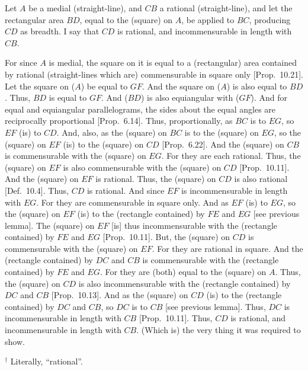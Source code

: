 \begin{Parallel}{}{}
{Let $A$ be a medial (straight-line), and $CB$ a rational (straight-line),
and let the rectangular area $BD$, equal to the (square) on $A$, 
 be applied to $BC$, producing $CD$ as breadth. I say that
$CD$ is rational, and incommensurable in  length with $CB$.

\epsfysize=2in
\centerline{}

For since $A$ is medial, the square on it is equal to a (rectangular) area
contained by rational (straight-lines which are) commensurable in square
only [Prop.~10.21]. Let the square on ($A$) be equal
to $GF$. And the square on ($A$) is also equal to $BD$. Thus, $BD$
is equal to $GF$. And ($BD$) is also equiangular with ($GF$). And for equal and
equiangular parallelograms, the sides about the equal angles are
reciprocally proportional [Prop.~6.14]. 
Thus, proportionally,  as $BC$ is to $EG$, so $EF$ (is) to $CD$.
And, also, as the (square) on $BC$ is to the (square) on $EG$, so
the (square) on $EF$ (is) to the (square) on $CD$ [Prop.~6.22]. 
And the (square) on $CB$ is commensurable with the (square) on $EG$.
For they are each rational. Thus, the (square) on $EF$ is also commensurable
with the (square) on $CD$ [Prop.~10.11]. And
the (square) on $EF$ is rational. Thus, the (square) on $CD$ is also rational
[Def.~10.4]. Thus, $CD$ is rational.
And since $EF$ is incommensurable in length with
$EG$. For they are commensurable in square only. And as $EF$ (is) to $EG$,
so the (square) on $EF$ (is) to the (rectangle contained) by $FE$ and $EG$ 
[see previous lemma]. The (square) on $EF$ [is] thus incommensurable with the (rectangle contained) by $FE$ and $EG$ [Prop.~10.11]. But, the (square) on $CD$
is commensurable with the (square) on $EF$. For they are rational
in square.
And the (rectangle contained) by $DC$ and $CB$ is commensurable
with the (rectangle contained) by $FE$ and $EG$. For they are (both)
equal to the (square) on $A$. Thus, the (square) on $CD$ is also
incommensurable with the (rectangle contained) by $DC$ and $CB$
[Prop.~10.13]. And as the (square) on $CD$
(is) to the (rectangle contained) by $DC$ and $CB$, so $DC$ is to $CB$ [see
previous lemma]. Thus, $DC$ is incommensurable in length with $CB$
[Prop.~10.11]. Thus, $CD$ is rational, and
incommensurable in length with $CB$. (Which is) the very thing it was required to show.}
\end{Parallel}
{\footnotesize\noindent$^\dag$  Literally, ``rational''.\\}


